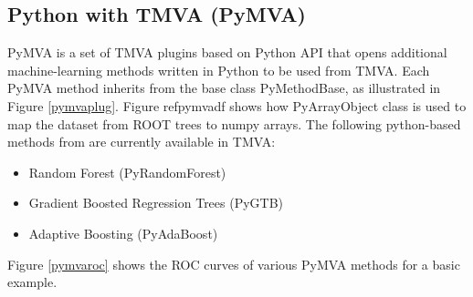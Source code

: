 \documentclass[a4paper]{jpconf}
\begin{document}
\subsection{Python with TMVA (PyMVA)} \label{PYMVA}
PyMVA is a set of TMVA plugins based on Python API that opens additional machine-learning methods written in Python to be used from TMVA. Each PyMVA method inherits from the base class PyMethodBase, as illustrated in Figure \ref{pymvaplug}. Figure ref{pymvadf} shows how PyArrayObject class is used to map the dataset from ROOT trees to numpy arrays. The following python-based methods from \cite{pedregosa2011scikit} are currently available in TMVA:


\begin{itemize}
\item Random Forest (PyRandomForest)
\item Gradient Boosted Regression Trees (PyGTB) 
\item Adaptive Boosting (PyAdaBoost) 
\end{itemize}
Figure \ref{pymvaroc} shows the ROC curves of various PyMVA methods for a basic example.
\end{document}
